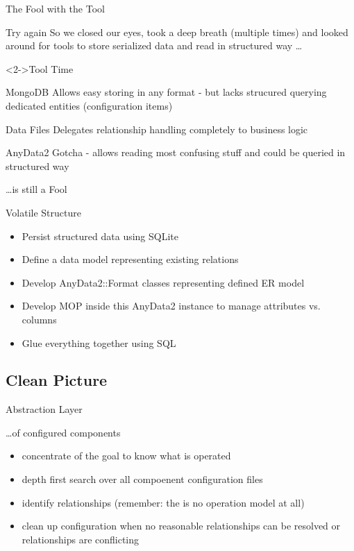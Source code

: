 \documentclass[ngerman,xcolor={table,dvipsnames},smaller,compress,hyperref={bookmarks,colorlinks}]{beamer}%
\begin{document}
\begin{frame}[fragile]{The Fool with the Tool}
\begin{block}{Try again}
So we closed our eyes, took a deep breath (multiple times) and looked around for tools to store serialized data and read in structured way \ldots
\end{block}
\begin{block}<2->{Tool Time}
\begin{description}
\item<2->{MongoDB} Allows easy storing in any format - but lacks strucured querying dedicated entities (configuration items)
\item<3->{Data Files} Delegates relationship handling completely to business logic
\item<4->{AnyData2} Gotcha - allows reading most confusing stuff and could be queried in structured way
\end{description}
\end{block}
\end{frame}

\begin{frame}[fragile]{\ldots is still a Fool}
\begin{block}{Volatile Structure}
\begin{itemize}
\item Persist structured data using SQLite
\item<2-> Define a data model representing existing relations
\item<3-> Develop AnyData2::Format classes representing defined ER model
\item<4-> Develop MOP inside this AnyData2 instance to manage attributes vs. columns
\item<5-> Glue everything together using SQL
\end{itemize}
\end{block}
\end{frame}

\subsection{Clean Picture}

\begin{frame}[fragile]{Abstraction Layer}
\begin{block}{\ldots of configured components}
\begin{itemize}
\item concentrate of the goal to know what is operated
\item<2-> depth first search over all compoenent configuration files
\item<3-> identify relationships (remember: the is no operation model at all)
\item<4-> clean up configuration when no reasonable relationships can be resolved or relationships are conflicting
\end{itemize}
\end{block}
\end{frame}
\end{document}
